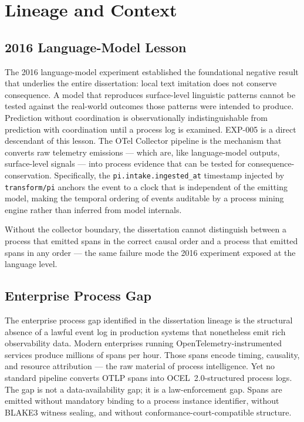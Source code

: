 \section{Lineage and Context}
\label{sec:otel-weaver-exp-005-collector-to-intake-lineage}

\subsection{2016 Language-Model Lesson}
\label{sec:otel-weaver-exp-005-collector-to-intake-lineage-2016}

The 2016 language-model experiment established the foundational negative result that underlies
the entire dissertation: local text imitation does not conserve consequence. A model that
reproduces surface-level linguistic patterns cannot be tested against the real-world outcomes
those patterns were intended to produce. Prediction without coordination is observationally
indistinguishable from prediction with coordination until a process log is examined. EXP-005
is a direct descendant of this lesson. The OTel Collector pipeline is the mechanism that
converts raw telemetry emissions --- which are, like language-model outputs, surface-level
signals --- into process evidence that can be tested for consequence-conservation. Specifically,
the \texttt{pi.intake.ingested\_at} timestamp injected by \texttt{transform/pi} anchors the
event to a clock that is independent of the emitting model, making the temporal ordering of
events auditable by a process mining engine rather than inferred from model internals.

Without the collector boundary, the dissertation cannot distinguish between a process that
emitted spans in the correct causal order and a process that emitted spans in any order ---
the same failure mode the 2016 experiment exposed at the language level.

\subsection{Enterprise Process Gap}
\label{sec:otel-weaver-exp-005-collector-to-intake-lineage-enterprise-gap}

The enterprise process gap identified in the dissertation lineage is the structural absence of
a lawful event log in production systems that nonetheless emit rich observability data. Modern
enterprises running OpenTelemetry-instrumented services produce millions of spans per hour.
Those spans encode timing, causality, and resource attribution --- the raw material of process
intelligence. Yet no standard pipeline converts OTLP spans into OCEL~2.0-structured process
logs. The gap is not a data-availability gap; it is a law-enforcement gap. Spans are emitted
without mandatory binding to a process instance identifier, without BLAKE3 witness sealing,
and without conformance-court-compatible structure.

